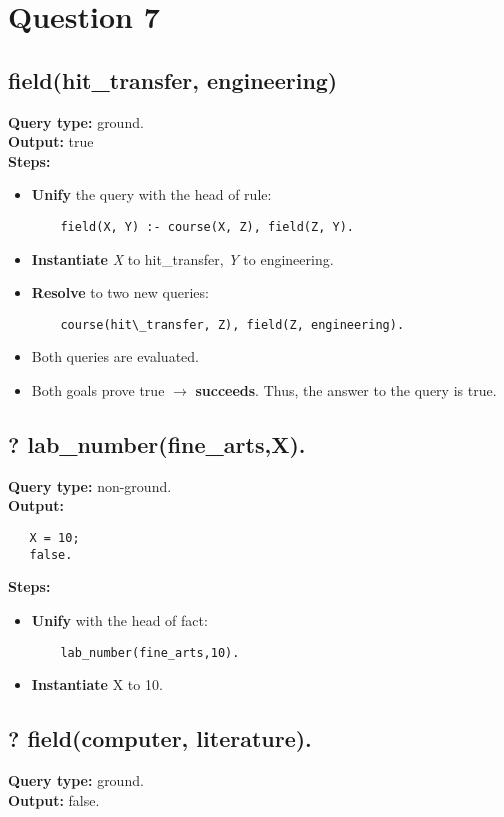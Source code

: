 \newpage
\section{Question 7}

\subsection{field(hit\_transfer, engineering)}
\textbf{Query type: } ground. \\
\textbf{Output:} true \\
\textbf{Steps:}
\begin{itemize}
    \item \textbf{Unify} the query with the head of rule:
    \begin{lstlisting}
    field(X, Y) :- course(X, Z), field(Z, Y).
    \end{lstlisting}
    \item \textbf{Instantiate} \textit{X} to hit\_transfer, \textit{Y} to engineering.
    \item \textbf{Resolve} to two new queries:
    \begin{lstlisting}
    course(hit\_transfer, Z), field(Z, engineering).
    \end{lstlisting}
\item Both queries are evaluated. 
\item Both goals prove true $\to $ \textbf{succeeds}. Thus, the answer to the query is true. 
\end{itemize}

\subsection{? lab\_number(fine\_arts,X).}
\textbf{Query type: } non-ground. \\
\textbf{Output:} 
\begin{lstlisting}
   X = 10;
   false.
\end{lstlisting}

\textbf{Steps:} 
\begin{itemize}
    \item \textbf{Unify} with the head of fact:
    \begin{lstlisting}
    lab_number(fine_arts,10).
    \end{lstlisting}
\item \textbf{Instantiate} X to 10.
\end{itemize}


\subsection{? field(computer, literature).}
\textbf{Query type: } ground. \\
\textbf{Output:} false. \\

